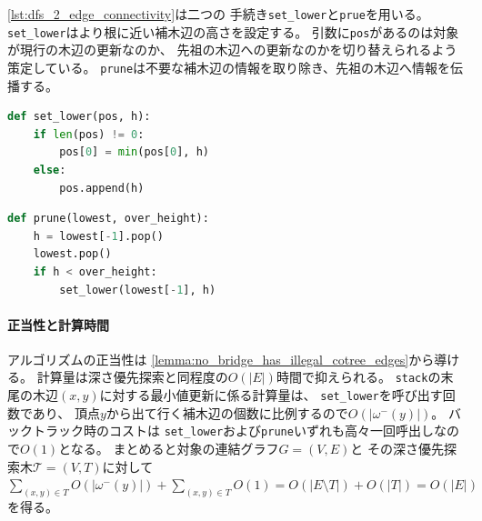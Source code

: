\lstrefname\ref{lst:dfs_2_edge_connectivity}は二つの
手続き{\tt set\_lower}と{\tt prue}を用いる。
{\tt set\_lower}はより根に近い補木辺の高さを設定する。
引数に{\tt pos}があるのは対象が現行の木辺の更新なのか、
先祖の木辺への更新なのかを切り替えられるよう策定している。
{\tt prune}は不要な補木辺の情報を取り除き、先祖の木辺へ情報を伝播する。

\begin{lstlisting}[language=Python, caption=set\_lower,
                   label=lst:set_lower]
def set_lower(pos, h):
    if len(pos) != 0:
        pos[0] = min(pos[0], h)
    else:
        pos.append(h)
\end{lstlisting}

\begin{lstlisting}[language=Python, caption=prune,
                   label=lst:prune_2_edge_connectivity]
def prune(lowest, over_height):
    h = lowest[-1].pop()
    lowest.pop()
    if h < over_height:
        set_lower(lowest[-1], h)
\end{lstlisting}

\paragraph{正当性と計算時間}
アルゴリズムの正当性は
\cref{lemma:no_bridge_has_illegal_cotree_edges}から導ける。
計算量は深さ優先探索と同程度の$O(|E|)$時間で抑えられる。
{\tt stack}の末尾の木辺$(x, y)$に対する最小値更新に係る計算量は、
{\tt set\_lower}を呼び出す回数であり、
頂点$y$から出て行く補木辺の個数に比例するので$O(|\omega^-(y)|)$。
バックトラック時のコストは
{\tt set\_lower}および{\tt prune}いずれも高々一回呼出しなので$O(1)$となる。
まとめると対象の連結グラフ$G=(V, E)$と
その深さ優先探索木${\mathcal T} = (V, T)$に対して
$\sum\limits_{(x, y) \in T}O(|\omega^-(y)|)+
\sum\limits_{(x, y) \in T}O(1) = O(|E \setminus T|)+O(|T|)=O(|E|)$を得る。






